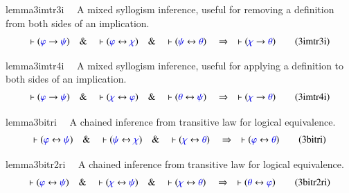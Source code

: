 \begin{restatable}{lemma}{3imtr3i}~~ A mixed syllogism inference, useful for
removing a definition from both
       sides of an implication. 
\begin{align}
\vdash ( \mw{\varphi} \rightarrow \mw{\psi} )\quad\&\quad \vdash ( \mw{\varphi}
    \leftrightarrow \mw{\chi} )\quad\&\quad \vdash ( \mw{\psi} \leftrightarrow
    \mw{\theta} )\quad\Rightarrow\quad \vdash ( \mw{\chi} \rightarrow
    \mw{\theta} )\label{eq:3imtr3i}\tag{3imtr3i}
\end{align}
\end{restatable}

\begin{restatable}{lemma}{3imtr4i}~~ A mixed syllogism inference, useful for
applying a definition to both
       sides of an implication. 
\begin{align}
\vdash ( \mw{\varphi} \rightarrow \mw{\psi} )\quad\&\quad \vdash ( \mw{\chi}
    \leftrightarrow \mw{\varphi} )\quad\&\quad \vdash ( \mw{\theta}
    \leftrightarrow \mw{\psi} )\quad\Rightarrow\quad \vdash ( \mw{\chi}
    \rightarrow \mw{\theta} )\label{eq:3imtr4i}\tag{3imtr4i}
\end{align}
\end{restatable}

\begin{restatable}{lemma}{3bitri}~~ A chained inference from transitive law for
logical equivalence.
\begin{align}
\vdash ( \mw{\varphi} \leftrightarrow \mw{\psi} )\quad\&\quad \vdash (
    \mw{\psi} \leftrightarrow \mw{\chi} )\quad\&\quad \vdash ( \mw{\chi}
    \leftrightarrow \mw{\theta} )\quad\Rightarrow\quad \vdash ( \mw{\varphi}
    \leftrightarrow \mw{\theta} )\label{eq:3bitri}\tag{3bitri}
\end{align}
\end{restatable}

\begin{restatable}{lemma}{3bitr2ri}~~ A chained inference from transitive law
for logical equivalence.
\begin{align}
\vdash ( \mw{\varphi} \leftrightarrow \mw{\psi} )\quad\&\quad \vdash (
    \mw{\chi} \leftrightarrow \mw{\psi} )\quad\&\quad \vdash ( \mw{\chi}
    \leftrightarrow \mw{\theta} )\quad\Rightarrow\quad \vdash ( \mw{\theta}
    \leftrightarrow \mw{\varphi} )\label{eq:3bitr2ri}\tag{3bitr2ri}
\end{align}
\end{restatable}

